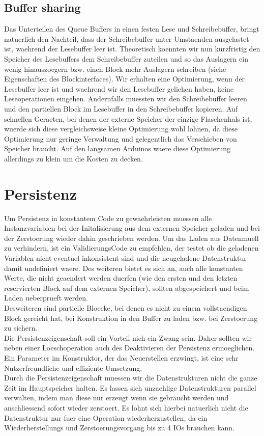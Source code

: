 \documentclass[10pt,a4paper]{article}
\begin{document}
\subsection{Buffer sharing}
Das Unterteilen des Queue Buffers in einen festen Lese und Schreibebuffer, bringt natuerlich den Nachteil, dass der Schreibebuffer unter Umstaenden ausgelastet ist, waehrend der Lesebuffer leer ist. Theoretisch koennten wir nun kurzfristig den Speicher des Lesebuffers dem Schreibebuffer zuteilen und so das Auslagern ein wenig hinauszoegern bzw. einen Block mehr Auslagern schreiben (siehe Eigenschaften des Blockinterfaces). Wir erhalten eine Optimierung, wenn der Lesebuffer leer ist und waehrend wir den Lesebuffer geliehen haben, keine Leseoperationen eingehen. Andernfalls muessten wir den Schreibebuffer leeren und den partiellen Block im Lesebuffer in den Schreibebuffer kopieren. Auf schnellen Geraeten, bei denen der externe Speicher der einzige Flaschenhals ist, wuerde sich diese vergleichsweise kleine Optimierung wohl lohnen, da diese Optimierung nur geringe Verwaltung und gelegentlich das Verschieben von Speicher braucht. Auf den langsamen Arduinos waere diese Optimierung allerdings zu klein um die Kosten zu decken.
\section{Persistenz}
Um Persistenz in konstantem Code zu gewaehrleisten muessen alle Instanzvariablen bei der Initalisierung aus dem externen Speicher geladen und bei der Zerstoerung wieder dahin geschrieben werden. Um das Laden aus Datenmuell zu verhindern, ist ein ValidierungsCode zu empfehlen, der testet ob die geladenen Variablen nicht eventuel inkonsistent sind und die neugeladene Datenstruktur damit undefiniert waere. Des weiteren bietet es sich an, auch alle konstanten Werte, die nicht geaendert werden duerfen (wie den ersten und den letzten reservierten Block auf dem externen Speicher), sollten abgespeichert und beim Laden ueberprueft werden.\\
Desweiteren sind partielle Bloecke, bei denen es nicht zu einem vollstaendigen Block gereicht hat, bei Konstruktion in den Buffer zu laden bzw. bei Zerstoerung zu sichern. \\
Die Persistenzeigenschaft soll ein Vorteil nich ein Zwang sein. Daher sollten wir neben einer Loeschoperation auch des Deaktivieren der Persistenz ermoeglichen. Ein Parameter im Konstruktor, der das Neuerstellen erzwingt, ist eine sehr Nutzerfreundliche und effiziente Umsetzung.\\
Durch die Persistenzeigenschaft muessen wir die Datenstrukturen nicht die ganze Zeit im Hauptspeicher halten. Es lassen sich unzaehlige Datenstrukturen parallel verwalten, indem man diese nur erzeugt wenn sie gebraucht werden und anschliessend sofort wieder zerstoert. Es lohnt sich hierbei natuerlich nicht die Datenstruktur nur fuer eine Operation wiederherzustellen, da ein Wiederherstellungs und Zerstoerungsvorgang bis zu 4 IOs brauchen kann.
\end{document}
